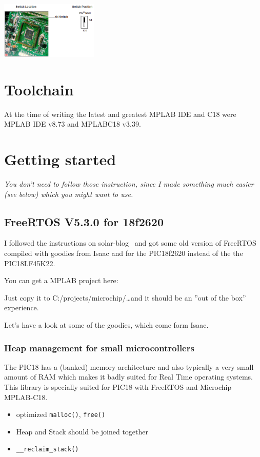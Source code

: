 \documentclass[a4paper,11pt]{article}
\begin{document}
 \begin{center}
  \includegraphics[width=0.35\textwidth]{board-S4}
 \end{center}

\section{Toolchain}
At the time of writing the latest and greatest MPLAB IDE and C18 were MPLAB
IDE v8.73 and MPLABC18 v3.39.

\section{Getting started}
\emph{You don't need to follow those instruction, since I made something much
easier (see below) which you might want to use.} 

\subsection{FreeRTOS V5.3.0 for 18f2620}

I followed the instructions on solar-blog~\cite{solar-blog-site} and got some
old version of FreeRTOS compiled with goodies from Isaac and for the PIC18f2620
instead of the the PIC18LF45K22.

You can get a MPLAB project here:


Just copy it to C:/projects/microchip/\ldots and it should be an ''out of the
box'' experience. 

Let's have a look at some of the goodies, which come form Isaac. 

\subsubsection{Heap management for small microcontrollers~\cite{isaac-heap}}
The PIC18 has a (banked) memory architecture and also typically a very small
amount of RAM which makes it badly suited for Real Time operating systems. This
library is specially suited for PIC18 with FreeRTOS and Microchip MPLAB-C18.

\begin{itemize}
  \item optimized {\tt malloc()}, {\tt free()}
  \item Heap and Stack should be joined together
  \item {\tt \_\_reclaim\_stack()}    
\end{itemize}
\end{document}
